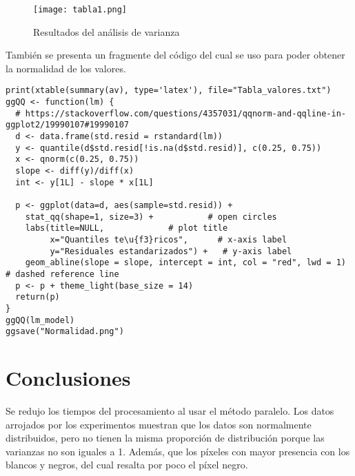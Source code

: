 \documentclass{article}
\begin{document}
\begin{figure}[H]
\centering
\texttt{[image: tabla1.png]}
\caption{Resultados del análisis de varianza}
\end{figure}
También se presenta un fragmente del código del cual se uso para poder obtener la normalidad de los valores. 

\begin{lstlisting}[frame=single]
print(xtable(summary(av), type='latex'), file="Tabla_valores.txt")
ggQQ <- function(lm) {
  # https://stackoverflow.com/questions/4357031/qqnorm-and-qqline-in-ggplot2/19990107#19990107
  d <- data.frame(std.resid = rstandard(lm))
  y <- quantile(d$std.resid[!is.na(d$std.resid)], c(0.25, 0.75))
  x <- qnorm(c(0.25, 0.75))
  slope <- diff(y)/diff(x)
  int <- y[1L] - slope * x[1L]
  
  p <- ggplot(data=d, aes(sample=std.resid)) +
    stat_qq(shape=1, size=3) +           # open circles
    labs(title=NULL,             # plot title
         x="Quantiles te\u{f3}ricos",      # x-axis label
         y="Residuales estandarizados") +   # y-axis label
    geom_abline(slope = slope, intercept = int, col = "red", lwd = 1)  # dashed reference line
  p <- p + theme_light(base_size = 14)
  return(p)
}
ggQQ(lm_model)
ggsave("Normalidad.png")
\end{lstlisting}

\section{Conclusiones}
Se redujo los tiempos del procesamiento al usar el método paralelo. Los datos arrojados por los experimentos muestran que los datos son normalmente distribuidos, pero no tienen la misma proporción de distribución porque las varianzas no son iguales a 1. Además, que los píxeles con mayor presencia con los blancos y negros, del cual resalta por poco el píxel negro.


\end{document}
